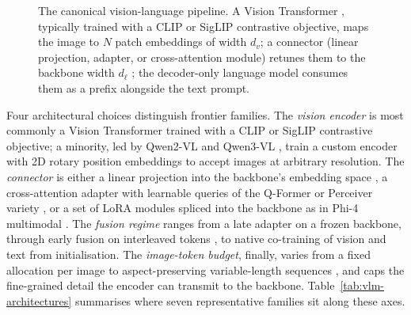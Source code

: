\begin{figure}[!ht]
  \caption[Canonical vision-language skeleton]{The canonical
  vision-language pipeline. A Vision Transformer
  \citep{dosovitskiy2021image}, typically trained with a CLIP
  \citep{radford2021clip} or SigLIP \citep{zhai2023sigmoid}
  contrastive objective, maps the image to $N$ patch embeddings
  of width $d_v$; a connector (linear projection, adapter, or
  cross-attention module) retunes them to the backbone width
  $d_\ell$ \citep{liu2023llava, li2023blip2}; the decoder-only
  language model consumes them as a prefix alongside the text
  prompt.}
  \label{fig:vlm-skeleton}
\end{figure}

Four architectural choices distinguish frontier families. The
\emph{vision encoder} is most commonly a Vision Transformer
\citep{dosovitskiy2021image} trained with a CLIP
\citep{radford2021clip} or SigLIP \citep{zhai2023sigmoid}
contrastive objective; a minority, led by Qwen2-VL and
Qwen3-VL \citep{bai2024qwen2vl, qwen2025qwen3vl}, train a
custom encoder with 2D rotary position embeddings to accept
images at arbitrary resolution. The \emph{connector} is either
a linear projection into the backbone's embedding space
\citep{liu2023llava}, a cross-attention adapter with learnable
queries of the Q-Former or Perceiver variety
\citep{alayrac2022flamingo, li2023blip2}, or a set of LoRA
modules \citep{hu2022lora} spliced into the backbone as in
Phi-4 multimodal \citep{microsoft2025phi4}. The \emph{fusion
regime} ranges from a late adapter on a frozen backbone,
through early fusion on interleaved tokens
\citep{meta2025llama4, chameleon2024}, to native co-training
of vision and text from initialisation. The \emph{image-token
budget}, finally, varies from a fixed allocation per image
\citep{team2025gemma3} to aspect-preserving variable-length
sequences \citep{bai2024qwen2vl}, and caps the fine-grained
detail the encoder can transmit to the backbone.
Table~\ref{tab:vlm-architectures} summarises where seven
representative families sit along these axes.

